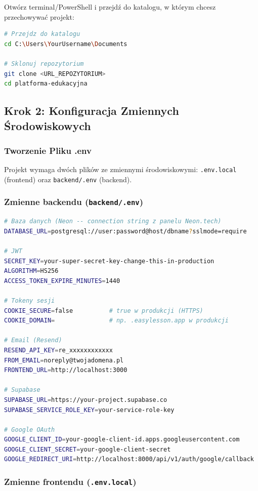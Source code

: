 \documentclass[12pt,a4paper]{article}
\begin{document}
Otwórz terminal/PowerShell i przejdź do katalogu, w którym chcesz przechowywać projekt:

\begin{lstlisting}[language=bash]
# Przejdz do katalogu
cd C:\Users\YourUsername\Documents

# Sklonuj repozytorium
git clone <URL_REPOZYTORIUM>
cd platforma-edukacyjna
\end{lstlisting}

\subsection{Krok 2: Konfiguracja Zmiennych Środowiskowych}

\subsubsection{Tworzenie Pliku .env}

Projekt wymaga dwóch plików ze zmiennymi środowiskowymi: \texttt{.env.local} (frontend) oraz \texttt{backend/.env} (backend).

\subsubsection{Zmienne backendu (\texttt{backend/.env})}

\begin{lstlisting}[language=bash]
# Baza danych (Neon -- connection string z panelu Neon.tech)
DATABASE_URL=postgresql://user:password@host/dbname?sslmode=require

# JWT
SECRET_KEY=your-super-secret-key-change-this-in-production
ALGORITHM=HS256
ACCESS_TOKEN_EXPIRE_MINUTES=1440

# Tokeny sesji
COOKIE_SECURE=false          # true w produkcji (HTTPS)
COOKIE_DOMAIN=               # np. .easylesson.app w produkcji

# Email (Resend)
RESEND_API_KEY=re_xxxxxxxxxxxx
FROM_EMAIL=noreply@twojadomena.pl
FRONTEND_URL=http://localhost:3000

# Supabase
SUPABASE_URL=https://your-project.supabase.co
SUPABASE_SERVICE_ROLE_KEY=your-service-role-key

# Google OAuth
GOOGLE_CLIENT_ID=your-google-client-id.apps.googleusercontent.com
GOOGLE_CLIENT_SECRET=your-google-client-secret
GOOGLE_REDIRECT_URI=http://localhost:8000/api/v1/auth/google/callback
\end{lstlisting}

\subsubsection{Zmienne frontendu (\texttt{.env.local})}
\end{document}
